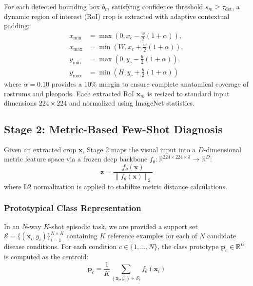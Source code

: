 \documentclass[conference]{IEEEtran}
\begin{document}
For each detected bounding box $b_m$ satisfying confidence threshold $s_m \ge \tau_{\text{det}}$, a dynamic region of interest (RoI) crop is extracted with adaptive contextual padding:
\begin{equation}
\begin{aligned}
x_{\min} &= \max(0, x_c - \frac{w}{2}(1 + \alpha)), \\
x_{\max} &= \min(W, x_c + \frac{w}{2}(1 + \alpha)), \\
y_{\min} &= \max(0, y_c - \frac{h}{2}(1 + \alpha)), \\
y_{\max} &= \min(H, y_c + \frac{h}{2}(1 + \alpha))
\end{aligned}
\end{equation}
where $\alpha = 0.10$ provides a 10\% margin to ensure complete anatomical coverage of rostrums and pleopods. Each extracted RoI $\mathbf{x}_m$ is resized to standard input dimensions $224 \times 224$ and normalized using ImageNet statistics.

\subsection{Stage 2: Metric-Based Few-Shot Diagnosis}

Given an extracted crop $\mathbf{x}$, Stage 2 maps the visual input into a $D$-dimensional metric feature space via a frozen deep backbone $f_\theta: \mathbb{R}^{224 \times 224 \times 3} \to \mathbb{R}^D$:
\begin{equation}
\mathbf{z} = \frac{f_\theta(\mathbf{x})}{\| f_\theta(\mathbf{x}) \|_2}
\end{equation}
where L2 normalization is applied to stabilize metric distance calculations.

\subsubsection{Prototypical Class Representation}
In an $N$-way $K$-shot episodic task, we are provided a support set $\mathcal{S} = \{(\mathbf{x}_i, y_i)\}_{i=1}^{N \times K}$ containing $K$ reference examples for each of $N$ candidate disease conditions. For each condition $c \in \{1, \dots, N\}$, the class prototype $\mathbf{p}_c \in \mathbb{R}^D$ is computed as the centroid:
\begin{equation}
\mathbf{p}_c = \frac{1}{K} \sum_{(\mathbf{x}_i, y_i) \in \mathcal{S}_c} f_\theta(\mathbf{x}_i)
\end{equation}
\end{document}
